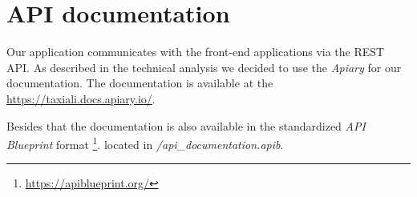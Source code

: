 \chapter{API documentation}
Our application communicates with the front-end applications via the REST API. As described in the technical analysis we decided to use the \textit{Apiary} for our documentation. The documentation is available at the \url{https://taxiali.docs.apiary.io/}.

Besides that the documentation is also available in the standardized \textit{API Blueprint} format \footnote{\url{https://apiblueprint.org/}}.
located in \textit{/api\_documentation.apib}.